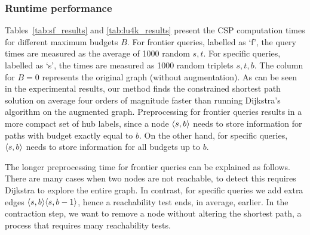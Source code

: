 \subsubsection{Runtime performance}


Tables~\ref{tab:sf_results} and \ref{tab:lu4k_results} present the CSP computation times for different maximum budgets $B$. 
For frontier queries, labelled as `f', the query times are measured as the average of 1000 random $s,t$.
For specific queries, labelled as `s', the times are measured as 1000 random triplets $s,t,b$.
The column for $B=0$ represents the original graph (without augmentation). 
As can be seen in the experimental results, our method finds the constrained shortest path solution on average four orders of magnitude faster than running Dijkstra's algorithm on the augmented graph. 
Preprocessing for frontier queries results in a more compact set of hub labels, since a node $\langle s,b\rangle$ needs to store information for paths with budget exactly equal to $b$.
On the other hand, for specific queries, $\langle s,b\rangle$ needs to store information for all budgets up to $b$.

The longer preprocessing time for frontier queries can be explained as follows.
There are many cases when two nodes are not reachable, to detect this requires Dijkstra to explore the entire graph.
In contrast, for specific queries we add extra edges $\langle s,b\rangle\langle s,b-1\rangle$, hence a reachability test ends, in average, earlier.
In the contraction step, we want to remove a node without altering the shortest path, a process that requires many reachability tests.

